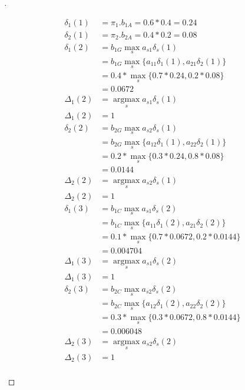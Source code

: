 \documentclass[a4paper, 12pt]{article}
\DeclareMathOperator*{\argmax}{argmax}
\DeclareMathOperator*{\max}{max}
\begin{document}
\begin{proof}[]
\begin{enumerate}[label={\color{blue}{\textbf{3.\arabic*})}}]
        \begin{align*}
            \delta_{1}(1) &= \pi_1.b_{1A} = 0.6*0.4 = 0.24\\
            \delta_{2}(1) &= \pi_2.b_{2A} = 0.4*0.2 = 0.08\\
            \delta_{1}(2) &= b_{1G}\max\limits_sa_{s1}\delta_{s}(1)\\
            &= b_{1G}\max\limits_s \{ a_{11}\delta_{1}(1), a_{21}\delta_{2}(1) \}\\
            &= 0.4*\max\limits_s \{ 0.7*0.24, 0.2*0.08 \}\\
            &= 0.0672\\
            \Delta_{1}(2) &= \argmax\limits_sa_{s1}\delta_{s}(1)\\
            \Delta_{1}(2) &= 1\\
            \delta_{2}(2) &= b_{2G}\max\limits_sa_{s2}\delta_{s}(1)\\
            &= b_{2G}\max\limits_s \{ a_{12}\delta_{1}(1), a_{22}\delta_{2}(1) \}\\
            &= 0.2*\max\limits_s \{ 0.3*0.24, 0.8*0.08 \}\\
            &= 0.0144\\
            \Delta_{2}(2) &= \argmax\limits_sa_{s2}\delta_{s}(1)\\
            \Delta_{2}(2) &= 1\\
            \delta_{1}(3) &= b_{1C}\max\limits_sa_{s1}\delta_{s}(2)\\
            &= b_{1C}\max\limits_s \{ a_{11}\delta_{1}(2), a_{21}\delta_{2}(2) \}\\
            &= 0.1*\max\limits_s \{ 0.7*0.0672, 0.2*0.0144 \}\\
            &= 0.004704\\
            \Delta_{1}(3) &= \argmax\limits_sa_{s1}\delta_{s}(2)\\
            \Delta_{1}(3) &= 1\\
            \delta_{2}(3) &= b_{2C}\max\limits_sa_{s2}\delta_{s}(2)\\
            &= b_{2C}\max\limits_s \{ a_{12}\delta_{1}(2), a_{22}\delta_{2}(2) \}\\
            &= 0.3*\max\limits_s \{ 0.3*0.0672, 0.8*0.0144 \}\\
            &= 0.006048\\
            \Delta_{2}(3) &= \argmax\limits_sa_{s2}\delta_{s}(2)\\
            \Delta_{2}(3) &= 1\\
        \end{align*}

\end{enumerate}
\end{proof}
\end{document}
